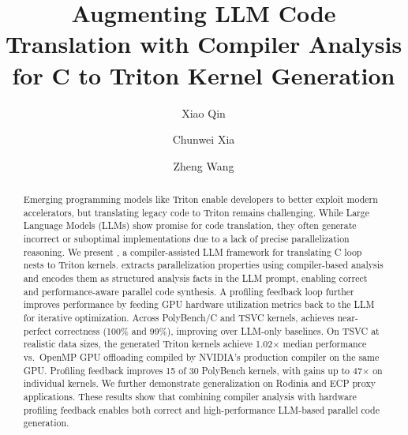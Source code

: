 \documentclass[sigconf]{acmart}
\begin{document}
\title{Augmenting LLM Code Translation with Compiler Analysis for C to Triton Kernel Generation}

\author{Xiao Qin}

\author{Chunwei Xia}

\author{Zheng Wang}




\begin{abstract}
Emerging programming models like Triton enable developers to better exploit modern accelerators, but translating legacy code to Triton remains challenging. While Large Language Models (LLMs) show promise for code translation, they often generate incorrect or suboptimal implementations due to a lack of precise parallelization reasoning.
%
We present \sysname, a compiler-assisted LLM framework for translating C loop nests to Triton kernels. \sysname extracts parallelization properties using compiler-based analysis and encodes them as structured analysis facts in the LLM prompt, enabling correct and performance-aware parallel code synthesis. A profiling feedback loop further improves performance by feeding GPU hardware utilization metrics back to the LLM for iterative optimization.
%
Across PolyBench/C and TSVC kernels, \sysname achieves near-perfect correctness (100\% and 99\%), improving over LLM-only baselines. On TSVC at realistic data sizes, the generated Triton kernels achieve 1.02$\times$ median performance vs.\ OpenMP GPU offloading compiled by NVIDIA's production compiler on the same GPU. Profiling feedback improves 15 of 30 PolyBench kernels, with gains up to 47$\times$ on individual kernels. We further demonstrate generalization on Rodinia and ECP proxy applications. These results show that combining compiler analysis with hardware profiling feedback enables both correct and high-performance LLM-based parallel code generation.



\end{abstract}
\end{document}
